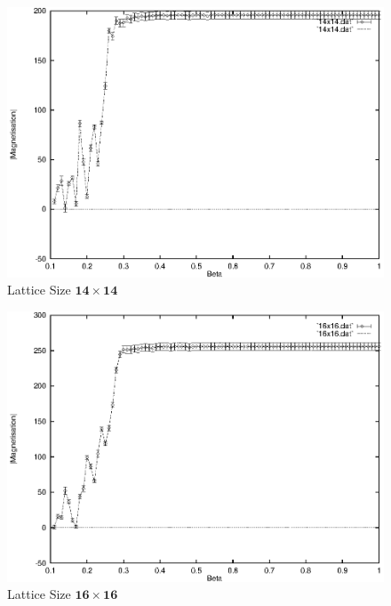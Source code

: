 \documentclass[a4paper]{IEEEtran}
\newcommand{\showcode}[1]{\begin{mdframed}[style=code] %
                          \end{mdframed}%
}
\begin{document}
    \begin{figure} 
    \caption{Lattice Size $\mathbf{14 \times 14}$}
    \label{fig:14x14-2} 
    \begin{center}
        \includegraphics[width=0.99\columnwidth]{14x14_2.eps}
    \end{center}
    \end{figure} 

    \begin{figure} 
    \caption{Lattice Size $\mathbf{16 \times 16}$}
    \label{fig:16x16-2} 
    \begin{center}
        \includegraphics[width=0.99\columnwidth]{16x16_2.eps}
    \end{center}
    \end{figure} 





    \onecolumn
    \showcode{ising.f} 
\end{document}
